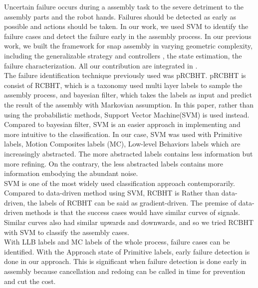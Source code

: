 %


Uncertain failure occurs during a assembly task to the severe detriment to the assembly parts and the robot hands. Failures should be detected as early as possible and actions should be taken. In our work, we used SVM to identify the failure cases and detect the failure early in the assembly process.
\indent In our previous work, we built the framework for snap assembly in varying geometric complexity, including the generalizable strategy and controllers\cite{2012JAR-Rojas-AutHetBotAsmbly} \cite{2012ICMA-Rojas-PivotApproach}, the state estimation\cite{2012IROS-Rojas-RCBHT}, the failure characterization\cite{2012Humanoids-Rojas-pRCBHT}. All our contribution are integrated in \cite{2013IJMA-Rojas-TwrdsSnapSensing}. \\
\indent The failure identification technique previously used was pRCBHT\cite{2013IJMA-Rojas-TwrdsSnapSensing}. pRCBHT is consist of RCBHT, which is a taxonomy used multi layer labels to sample the assembly process, and bayesian filter, which takes the labels as input and predict the result of the assembly with Markovian assumption. In this paper, rather than using the probabilistic methods, Support Vector Machine(SVM) is used instead. Compared to bayesian filter, SVM is an easier approach in implementing and more intuitive to the classification. In our case, SVM was used with Primitive labels, Motion Composites labels (MC), Low-level Behaviors labels which are increasingly abstracted. The more abstracted labels contains less information but more refining. On the contrary, the less abstracted labels contains more information embodying the abundant noise. \\
\indent SVM is one of the most widely used classification approach contemporarily. Compared to data-driven method using SVM\cite{masonfailure}, RCBHT is Rather than data-driven, the labels of RCBHT can be said as gradient-driven. The premise of data-driven methods is that the success cases would have similar curves of signals. Similar curves also had similar upwards and downwards, and so we tried RCBHT with SVM to classify the assembly cases. \\
\indent With LLB labels and MC labels of the whole process, failure cases can be identified. With the Approach state of Primitive labels, early failure detection is done in our approach. This is significant when failure detection is done early in assembly because cancellation and redoing can be called in time for prevention and cut the cost.\\
